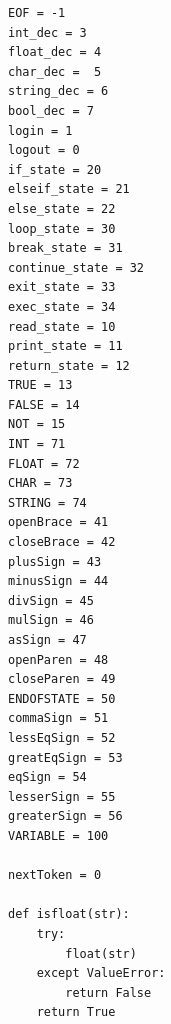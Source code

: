 \documentclass[11pt,a4paper]{report}
\begin{document}
\begin{lstlisting}
EOF = -1
int_dec = 3
float_dec = 4
char_dec =  5
string_dec = 6
bool_dec = 7
login = 1
logout = 0
if_state = 20
elseif_state = 21
else_state = 22
loop_state = 30
break_state = 31
continue_state = 32
exit_state = 33
exec_state = 34
read_state = 10
print_state = 11
return_state = 12
TRUE = 13
FALSE = 14
NOT = 15
INT = 71
FLOAT = 72
CHAR = 73
STRING = 74
openBrace = 41
closeBrace = 42
plusSign = 43
minusSign = 44
divSign = 45
mulSign = 46
asSign = 47
openParen = 48
closeParen = 49
ENDOFSTATE = 50
commaSign = 51
lessEqSign = 52
greatEqSign = 53
eqSign = 54
lesserSign = 55
greaterSign = 56
VARIABLE = 100

nextToken = 0

def isfloat(str):
    try:
        float(str)
    except ValueError:
        return False
    return True


\end{lstlisting}
\end{document}
